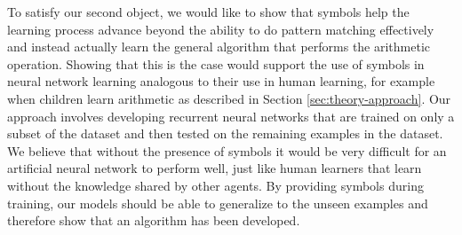 To satisfy our second object, we would like to show that symbols help the learning process advance beyond the ability to do pattern matching effectively and instead actually learn the general algorithm that performs the arithmetic operation. Showing that this is the case would support the use of symbols in neural network learning analogous to their use in human learning, for example when children learn arithmetic as described in Section \ref{sec:theory-approach}. Our approach involves developing recurrent neural networks that are trained on only a subset of the dataset and then tested on the remaining examples in the dataset. We believe that without the presence of symbols it would be very difficult for an artificial neural network to perform well, just like human learners that learn without the knowledge shared by other agents. By providing symbols during training, our models should be able to generalize to the unseen examples and therefore show that an algorithm has been developed.
